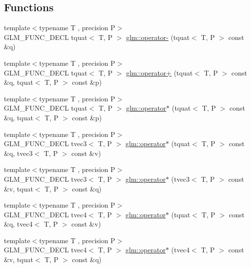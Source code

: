 \subsection*{Functions}
\begin{DoxyCompactItemize}
\item 
{\footnotesize template$<$typename T , precision P$>$ }\\G\+L\+M\+\_\+\+F\+U\+N\+C\+\_\+\+D\+E\+C\+L tquat$<$ T, P $>$ \hyperlink{group__gtc__quaternion_ga64cdb5fcebb192579798cfe79670239f}{glm\+::operator-\/} (tquat$<$ T, P $>$ const \&q)
\item 
{\footnotesize template$<$typename T , precision P$>$ }\\G\+L\+M\+\_\+\+F\+U\+N\+C\+\_\+\+D\+E\+C\+L tquat$<$ T, P $>$ \hyperlink{group__gtc__quaternion_ga517657374d8ca180d63c33ff9430518a}{glm\+::operator+} (tquat$<$ T, P $>$ const \&q, tquat$<$ T, P $>$ const \&p)
\item 
{\footnotesize template$<$typename T , precision P$>$ }\\G\+L\+M\+\_\+\+F\+U\+N\+C\+\_\+\+D\+E\+C\+L tquat$<$ T, P $>$ \hyperlink{group__gtc__quaternion_gabca7455f687e322b505531e15786d845}{glm\+::operator$\ast$} (tquat$<$ T, P $>$ const \&q, tquat$<$ T, P $>$ const \&p)
\item 
{\footnotesize template$<$typename T , precision P$>$ }\\G\+L\+M\+\_\+\+F\+U\+N\+C\+\_\+\+D\+E\+C\+L tvec3$<$ T, P $>$ \hyperlink{group__gtc__quaternion_ga5b0cccc7f163f2b7bbf3536deb403d9a}{glm\+::operator$\ast$} (tquat$<$ T, P $>$ const \&q, tvec3$<$ T, P $>$ const \&v)
\item 
{\footnotesize template$<$typename T , precision P$>$ }\\G\+L\+M\+\_\+\+F\+U\+N\+C\+\_\+\+D\+E\+C\+L tvec3$<$ T, P $>$ \hyperlink{group__gtc__quaternion_ga70dbac44fc9fb59659218ad4ed7870ed}{glm\+::operator$\ast$} (tvec3$<$ T, P $>$ const \&v, tquat$<$ T, P $>$ const \&q)
\item 
{\footnotesize template$<$typename T , precision P$>$ }\\G\+L\+M\+\_\+\+F\+U\+N\+C\+\_\+\+D\+E\+C\+L tvec4$<$ T, P $>$ \hyperlink{group__gtc__quaternion_gaeee3d385665cb25b6d728524b8d8fa66}{glm\+::operator$\ast$} (tquat$<$ T, P $>$ const \&q, tvec4$<$ T, P $>$ const \&v)
\item 
{\footnotesize template$<$typename T , precision P$>$ }\\G\+L\+M\+\_\+\+F\+U\+N\+C\+\_\+\+D\+E\+C\+L tvec4$<$ T, P $>$ \hyperlink{group__gtc__quaternion_ga9f4715d30e26cde878f16fef75b8e049}{glm\+::operator$\ast$} (tvec4$<$ T, P $>$ const \&v, tquat$<$ T, P $>$ const \&q)

\end{DoxyCompactItemize}
